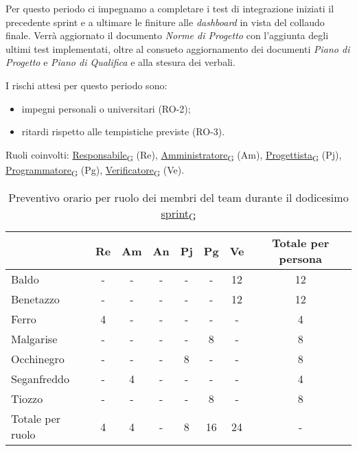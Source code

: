 Per questo periodo ci impegnamo a completare i test di integrazione iniziati il precedente sprint e a ultimare le finiture alle \textit{dashboard} in vista del collaudo finale. Verrà aggiornato il documento \textit{Norme di Progetto} con l'aggiunta degli ultimi test implementati, oltre al consueto aggiornamento dei documenti \textit{Piano di Progetto} e \textit{Piano di Qualifica} e alla stesura dei verbali.

I rischi attesi per questo periodo sono:
\begin{itemize}
    \item impegni personali o universitari (RO-2);
	\item ritardi rispetto alle tempistiche previste (RO-3).
\end{itemize}

\newpage
{}
Ruoli coinvolti: \href{https://7last.github.io/docs/pb/documentazione-interna/glossario\#responsabile}{Responsabile\textsubscript{G}} (Re), \href{https://7last.github.io/docs/pb/documentazione-interna/glossario\#amministratore}{Amministratore\textsubscript{G}} (Am), \href{https://7last.github.io/docs/pb/documentazione-interna/glossario\#progettista}{Progettista\textsubscript{G}} (Pj), \href{https://7last.github.io/docs/pb/documentazione-interna/glossario\#programmatore}{Programmatore\textsubscript{G}} (Pg), \href{https://7last.github.io/docs/pb/documentazione-interna/glossario\#verificatore}{Verificatore\textsubscript{G}} (Ve).
\begin{table}[!h]
    \centering
    \begin{tabular}{ | l | c | c | c | c | c | c | c | }
        \hline
        \textbf{} & \textbf{Re} & \textbf{Am} &\textbf{An} & \textbf{Pj} & \textbf{Pg} & \textbf{Ve} & \textbf{Totale per persona} \\
        \hline
        Baldo            &  -   &  -   &  -   &  -   &  -   & 12   & 12   \\
        Benetazzo        &  -   &  -   &  -   &  -   &  -   & 12   & 12   \\
        Ferro            &  4   &  -   &  -   &  -   &  -   &  -   &  4   \\
        Malgarise        &  -   &  -   &  -   &  -   &  8   &  -   &  8   \\
        Occhinegro       &  -   &  -   &  -   &  8   &  -   &  -   &  8   \\
        Seganfreddo      &  -   &  4   &  -   &  -   &  -   &  -   &  4   \\
        Tiozzo           &  -   &  -   &  -   &  -   &  8   &  -   &  8   \\
        \hline
        Totale per ruolo &  4   &  4   &  -   &  8   & 16   & 24   &  -   \\
        \hline
    \end{tabular}
    \caption{Preventivo orario per ruolo dei membri del team durante il dodicesimo \href{https://7last.github.io/docs/pb/documentazione-interna/glossario\#sprint}{sprint\textsubscript{G}}}
    
\end{table}

